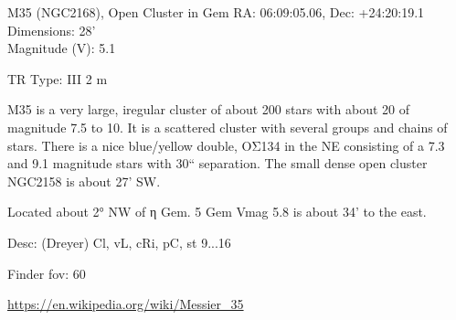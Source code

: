 \begin{block}{M35 (NGC2168), Open Cluster in Gem}
    RA: 06:09:05.06, Dec: +24:20:19.1 \\ 
    Dimensions: 28' \\ 
    Magnitude (V): 5.1

    TR Type: III 2 m

    M35 is a very large, iregular cluster of about 200 stars with about 20 of
    magnitude 7.5 to 10. It is a scattered cluster with several groups and
    chains of stars. There is a nice blue/yellow double, OΣ134 in the NE
    consisting of a 7.3 and 9.1 magnitude stars with 30`` separation. The small
    dense open cluster NGC2158 is about 27' SW.

    Located about 2° NW of η Gem. 5 Gem Vmag 5.8 is about 34' to the east. 


    Desc: (Dreyer) Cl, vL, cRi, pC, st 9...16 

    Finder fov: 60 

    \url{https://en.wikipedia.org/wiki/Messier_35} 
\end{block}
